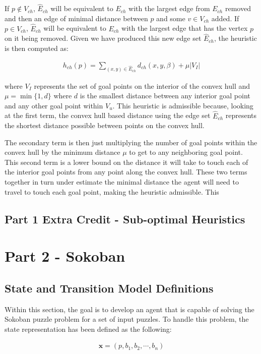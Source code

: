 \documentclass{article}[12pt]
\begin{document}
If $p \notin V_{ch}$, $\hat{E}_{ch}$ will be equivalent to $E_{ch}$ with the largest edge from $E_{ch}$ removed and then an edge of minimal distance between $p$ and some $v \in V_{ch}$ added. If $p \in V_{ch}$, $\hat{E}_{ch}$ will be equivalent to $E_{ch}$ with the largest edge that has the vertex $p$ on it being removed. Given we have produced this new edge set $\hat{E}_{ch}$, the heuristic is then computed as:

\begin{align*}
h_{ch}(p) = \sum_{(x,y) \in \hat{E}_{ch}} d_{ch}(x,y, \beta) + \mu |V_I|
\end{align*}

where $V_I$ represents the set of goal points on the interior of the convex hull and $\mu = \min \lbrace 1, d \rbrace $ where $d$ is the smallest distance between any interior goal point and any other goal point within $V_u$. This heuristic is admissible because, looking at the first term, the convex hull based distance using the edge set $\hat{E}_{ch}$ represents the shortest distance possible between points on the convex hull. 

The secondary term is then just multiplying the number of goal points within the convex hull by the minimum distance $\mu$ to get to any neighboring goal point. This second term is a lower bound on the distance it will take to touch each of the interior goal points from any point along the convex hull. These two terms together in turn under estimate the minimal distance the agent will need to travel to touch each goal point, making the heuristic admissible. This
   \newpage
   \subsection{Part 1 Extra Credit - Sub-optimal Heuristics}
   
   \newpage
   \section{Part 2 - Sokoban}
   \subsection{State and Transition Model Definitions}
   Within this section, the goal is to develop an agent that is capable of solving the Sokoban puzzle problem for a set of input puzzles. To handle this problem, the state representation has been defined as the following:
   
   \begin{align*}
   \boldsymbol{x} = \left( p, b_1, b_2, \cdots, b_n \right)
   \end{align*}
   
\end{document}
